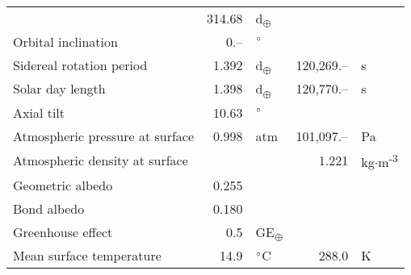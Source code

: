 \begin{tabular}{|p{4cm}|r l|r l|}
  & 314.68 & d\textsubscript{$\oplus$} & & \\
  Orbital inclination & 0.-- & $\degree$ & & \\
  Sidereal rotation period & 1.392 & d\textsubscript{$\oplus$} & 120,269.-- & s \\
  Solar day length & 1.398 & d\textsubscript{$\oplus$} & 120,770.-- & s \\
  Axial tilt & 10.63 & $\degree$ & & \\
  Atmospheric pressure at surface & 0.998 & atm & 101,097.-- & Pa \\
  Atmospheric density at surface & & & 1.221 & kg$\cdot$m\textsuperscript{-3} \\
  Geometric albedo & 0.255 & & & \\
  Bond albedo & 0.180 & & & \\
  Greenhouse effect & 0.5 & GE\textsubscript{$\oplus$} & & \\
  Mean surface temperature & 14.9 & $\degree$C & 288.0 & K \\
  \hline
\end{tabular}
\newpage
